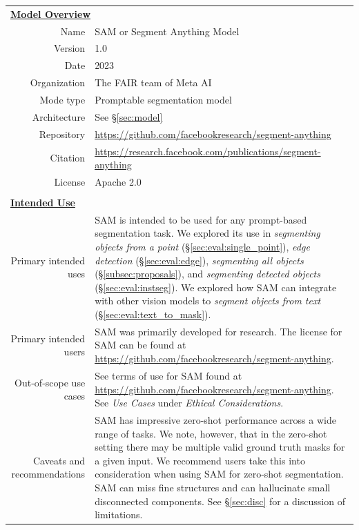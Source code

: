 \documentclass[10pt,twocolumn,letterpaper]{article}
\newcommand{\sam}{SAM\xspace}
\begin{document}
\begin{table}\centering\fontsize{7.5}{8.4}\selectfont
\begin{tabular*}{\linewidth}{r|p{12cm}}
\multicolumn{2}{l}{\bf\underline{Model Overview}} \\
Name & \sam or Segment Anything Model \\
Version & 1.0 \\
Date & 2023 \\
Organization & The FAIR team of Meta AI\\
Mode type & Promptable segmentation model \\
Architecture & See \S\ref{sec:model} \\
Repository & \href{https://github.com/facebookresearch/segment-anything}{https://github.com/facebookresearch/segment-anything} \\
Citation & \href{https://research.facebook.com/publications/segment-anything}{https://research.facebook.com/publications/segment-anything} \\
License & Apache 2.0 \\
\multicolumn{2}{c}{} \\
\multicolumn{2}{l}{\bf\underline{Intended Use}} \\
Primary intended uses & \sam is intended to be used for any prompt-based segmentation task. We explored its use in \textit{segmenting objects from a point} (\S\ref{sec:eval:single_point}), \textit{edge detection} (\S\ref{sec:eval:edge}), \textit{segmenting all objects} (\S\ref{subsec:proposals}), and \textit{segmenting detected objects} (\S\ref{sec:eval:instseg}). We explored how \sam can integrate with other vision models to \textit{segment objects from text} (\S\ref{sec:eval:text_to_mask}). \\
Primary intended users & \sam was primarily developed for research. The license for \sam can be found at \href{https://github.com/facebookresearch/segment-anything}{https://github.com/facebookresearch/segment-anything}. \\
Out-of-scope use cases & See terms of use for \sam found at \href{https://github.com/facebookresearch/segment-anything}{https://github.com/facebookresearch/segment-anything}. See \textit{Use Cases} under \textit{Ethical Considerations}. \\
Caveats and recommendations & \sam has impressive zero-shot performance across a wide range of tasks. We note, however, that in the zero-shot setting there may be multiple valid ground truth masks for a given input. We recommend users take this into consideration when using \sam for zero-shot segmentation. \sam can miss fine structures and can hallucinate small disconnected components. See \S\ref{sec:disc} for a discussion of limitations. \\

\end{tabular*}
\end{table}
\end{document}
